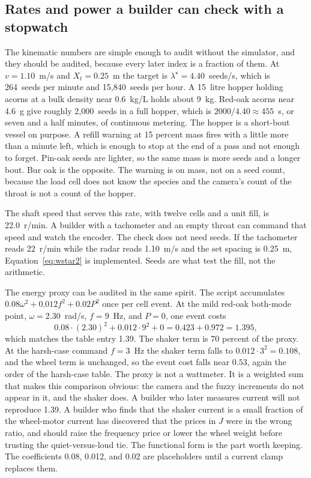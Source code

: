 \subsection{Rates and power a builder can check with a stopwatch}

The kinematic numbers are simple enough to audit without the simulator, and they should be audited, because every later index is a fraction of them. At $v=1.10$~m/s and $X_t=0.25$~m the target is $\lambda^{\star}=4.40$~seeds/s, which is 264~seeds per minute and 15{,}840~seeds per hour. A 15~litre hopper holding acorns at a bulk density near 0.6~kg/L holds about 9~kg. Red-oak acorns near 4.6~g give roughly 2{,}000~seeds in a full hopper, which is $2000/4.40\approx 455$~s, or seven and a half minutes, of continuous metering. The hopper is a short-bout vessel on purpose. A refill warning at 15 percent mass fires with a little more than a minute left, which is enough to stop at the end of a pass and not enough to forget. Pin-oak seeds are lighter, so the same mass is more seeds and a longer bout. Bur oak is the opposite. The warning is on mass, not on a seed count, because the load cell does not know the species and the camera's count of the throat is not a count of the hopper.

The shaft speed that serves this rate, with twelve cells and a unit fill, is 22.0~r/min. A builder with a tachometer and an empty throat can command that speed and watch the encoder. The check does not need seeds. If the tachometer reads 22~r/min while the radar reads 1.10~m/s and the set spacing is 0.25~m, Equation~\eqref{eq:wstar2} is implemented. Seeds are what test the fill, not the arithmetic.

The energy proxy can be audited in the same spirit. The script accumulates $0.08\omega^2+0.012 f^2+0.02 P^2$ once per cell event. At the mild red-oak both-mode point, $\omega=2.30$~rad/s, $f=9$~Hz, and $P=0$, one event costs
\begin{equation}
0.08\cdot(2.30)^2 + 0.012\cdot 9^2 + 0 = 0.423 + 0.972 = 1.395,
\end{equation}
which matches the table entry 1.39. The shaker term is 70 percent of the proxy. At the harsh-case command $f=3$~Hz the shaker term falls to $0.012\cdot 3^{2}=0.108$, and the wheel term is unchanged, so the event cost falls near $0.53$, again the order of the harsh-case table. The proxy is not a wattmeter. It is a weighted sum that makes this comparison obvious: the camera and the fuzzy increments do not appear in it, and the shaker does. A builder who later measures current will not reproduce 1.39. A builder who finds that the shaker current is a small fraction of the wheel-motor current has discovered that the prices in $J$ were in the wrong ratio, and should raise the frequency price or lower the wheel weight before trusting the quiet-versus-loud tie. The functional form is the part worth keeping. The coefficients 0.08, 0.012, and 0.02 are placeholders until a current clamp replaces them.

